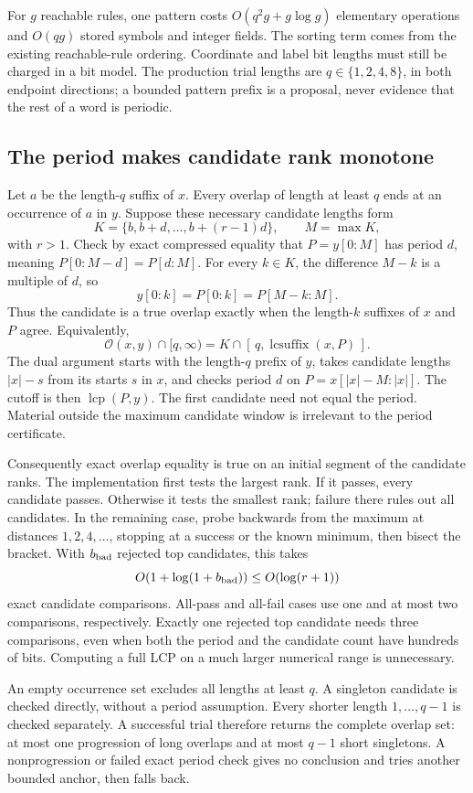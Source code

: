 For $g$ reachable rules, one pattern costs $O(q^2g+g\log g)$ elementary
operations and $O(qg)$ stored symbols and integer fields. The sorting term
comes from the existing reachable-rule ordering. Coordinate and label bit
lengths must still be charged in a bit model. The production trial lengths
are $q\in\{1,2,4,8\}$, in both endpoint directions; a bounded pattern prefix
is a proposal, never evidence that the rest of a word is periodic.

\subsection{The period makes candidate rank monotone}
Let $a$ be the length-$q$ suffix of $x$. Every overlap of length at least
$q$ ends at an occurrence of $a$ in $y$. Suppose these necessary candidate
lengths form
\[
 K=\{b,b+d,\ldots,b+(r-1)d\},\qquad M=\max K,
\]
with $r>1$. Check by exact compressed equality that $P=y[0:M]$ has period
$d$, meaning $P[0:M-d]=P[d:M]$. For every $k\in K$, the difference
$M-k$ is a multiple of $d$, so
\[
 y[0:k]=P[0:k]=P[M-k:M].
\]
Thus the candidate is a true overlap exactly when the length-$k$ suffixes
of $x$ and $P$ agree. Equivalently,
\[
 \mathcal O(x,y)\cap[q,\infty)
     =K\cap[\,q,\operatorname{lcsuffix}(x,P)\,].
\]
The dual argument starts with the length-$q$ prefix of $y$, takes candidate
lengths $|x|-s$ from its starts $s$ in $x$, and checks period $d$ on
$P=x[|x|-M:|x|]$. The cutoff is then $\operatorname{lcp}(P,y)$.
The first candidate need not equal the period. Material outside the maximum
candidate window is irrelevant to the period certificate.

Consequently exact overlap equality is true on an initial segment of the
candidate ranks. The implementation first tests the largest rank. If it
passes, every candidate passes. Otherwise it tests the smallest rank; failure
there rules out all candidates. In the remaining case, probe backwards from
the maximum at distances $1,2,4,\ldots$, stopping at a success or the known
minimum, then bisect the bracket. With $b_{\rm bad}$ rejected top candidates,
this takes
\[
 O(1+\log(1+b_{\rm bad}))\le O(\log(r+1))
\]
exact candidate comparisons. All-pass and all-fail cases use one and at most
two comparisons, respectively. Exactly one rejected top candidate needs three
comparisons, even when both the period and the candidate count have hundreds
of bits. Computing a full LCP on a much larger numerical range is unnecessary.

An empty occurrence set excludes all lengths at least $q$. A singleton
candidate is checked directly, without a period assumption. Every shorter
length $1,\ldots,q-1$ is checked separately. A successful trial therefore
returns the complete overlap set: at most one progression of long overlaps
and at most $q-1$ short singletons. A nonprogression or failed exact period
check gives no conclusion and tries another bounded anchor, then falls back.

